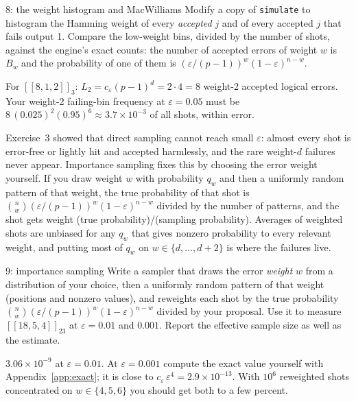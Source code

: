 \documentclass[11pt]{article}
\newcommand{\eps}{\varepsilon}
\newcommand{\code}[1]{\texttt{#1}}
\begin{document}
\begin{exercise}{8: the weight histogram and MacWilliams}
Modify a copy of \code{simulate} to histogram the Hamming weight of every
\emph{accepted} $j$ and of every accepted $j$ that fails output 1. Compare the
low-weight bins, divided by the number of shots, against the engine's exact counts:
the number of accepted errors of weight $w$ is $B_w$ and the probability of one of
them is $(\eps/(p-1))^{w}(1-\eps)^{n-w}$.
\end{exercise}
\begin{checkbox}
For $[[8,1,2]]_3$: $L_2 = c_\eps (p-1)^d = 2\cdot 4 = 8$ weight-2 accepted logical
errors. Your weight-2 failing-bin frequency at $\eps=0.05$ must be
$8\,(0.025)^{2}(0.95)^{6} \approx 3.7\times10^{-3}$ of all shots, within error.
\end{checkbox}

Exercise~3 showed that direct sampling cannot reach small $\eps$: almost every shot
is error-free or lightly hit and accepted harmlessly, and the rare weight-$d$
failures never appear. Importance sampling fixes this by choosing the error weight
yourself. If you draw weight $w$ with probability $q_w$ and then a uniformly random
pattern of that weight, the true probability of that shot is $\binom{n}{w}
(\eps/(p-1))^{w}(1-\eps)^{n-w}$ divided by the number of patterns, and the shot gets
weight (true probability)/(sampling probability). Averages of weighted shots are
unbiased for any $q_w$ that gives nonzero probability to every relevant weight, and
putting most of $q_w$ on $w\in\{d,\dots,d+2\}$ is where the failures live.

\begin{exercise}{9: importance sampling}\label{ex:is}
Write a sampler that draws the error \emph{weight} $w$ from a distribution of your
choice, then a uniformly random pattern of that weight (positions and nonzero
values), and reweights each shot by the true probability $\binom{n}{w}(\eps/(p-1))^{w}
(1-\eps)^{n-w}$ divided by your proposal. Use it to measure $[[18,5,4]]_{23}$ at
$\eps=0.01$ and $0.001$. Report the effective sample size as well as the estimate.
\end{exercise}
\begin{checkbox}
$3.06\times10^{-9}$ at $\eps=0.01$. At $\eps=0.001$ compute the exact value yourself
with Appendix~\ref{app:exact}; it is close to $c_\eps\,\eps^{4} = 2.9\times10^{-13}$.
With $10^{6}$ reweighted shots concentrated on $w\in\{4,5,6\}$ you should get both to
a few percent.
\end{checkbox}
\end{document}
